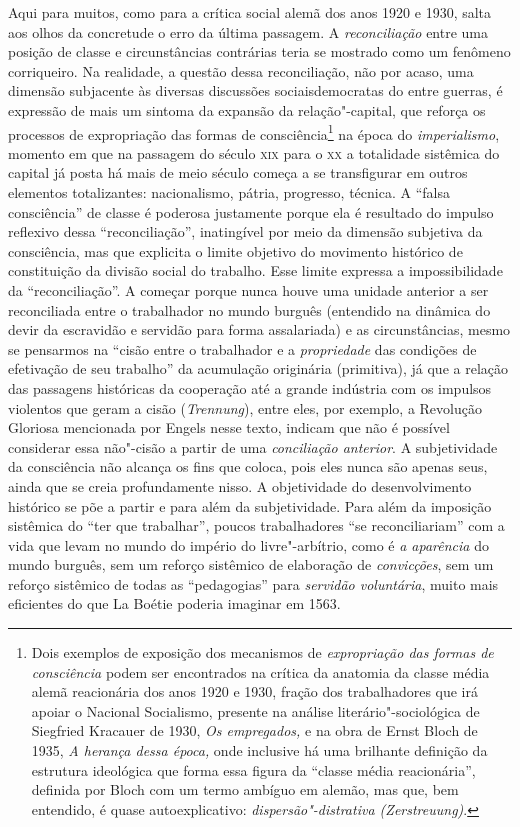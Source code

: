 Aqui para muitos, como para a crítica social alemã dos anos 1920 e 1930,
salta aos olhos da concretude o erro da última passagem. A
\emph{reconciliação} entre uma posição de classe e circunstâncias
contrárias teria se mostrado como um fenômeno corriqueiro. Na realidade,
a questão dessa reconciliação, não por acaso, uma dimensão subjacente às
diversas discussões sociaisdemocratas do entre guerras, é expressão de
mais um sintoma da expansão da relação"-capital, que reforça os processos
de expropriação das formas de consciência\footnote{Dois exemplos de
  exposição dos mecanismos de \emph{expropriação das formas de
  consciência} podem ser encontrados na crítica da anatomia da classe
  média alemã reacionária dos anos 1920 e 1930, fração dos trabalhadores
  que irá apoiar o Nacional Socialismo, presente na análise
  literário"-sociológica de Siegfried Kracauer de 1930, \emph{Os
  empregados,} e na obra de Ernst Bloch de 1935, \emph{A herança dessa
  época,} onde inclusive há uma brilhante definição da estrutura
  ideológica que forma essa figura da ``classe média reacionária'',
  definida por Bloch com um termo ambíguo em alemão, mas que, bem
  entendido, é quase autoexplicativo: \emph{dispersão"-distrativa
  (Zerstreuung)}.} na época do \emph{imperialismo}, momento em que na
passagem do século \textsc{xix} para o \textsc{xx} a totalidade sistêmica do capital já
posta há mais de meio século começa a se transfigurar em outros
elementos totalizantes: nacionalismo, pátria, progresso, técnica. A
``falsa consciência'' de classe é poderosa justamente porque ela é
resultado do impulso reflexivo dessa ``reconciliação'', inatingível por
meio da dimensão subjetiva da consciência, mas que explicita o limite
objetivo do movimento histórico de constituição da divisão social do
trabalho. Esse limite expressa a impossibilidade da ``reconciliação''. A
começar porque nunca houve uma unidade anterior a ser reconciliada entre
o trabalhador no mundo burguês (entendido na dinâmica do devir da
escravidão e servidão para forma assalariada) e as circunstâncias, mesmo
se pensarmos na ``cisão entre o trabalhador e a \emph{propriedade} das
condições de efetivação de seu trabalho'' da acumulação originária
(primitiva), já que a relação das passagens históricas da cooperação até
a grande indústria com os impulsos violentos que geram a cisão
(\emph{Trennung}), entre eles, por exemplo, a Revolução Gloriosa
mencionada por Engels nesse texto, indicam que não é possível considerar
essa não"-cisão a partir de uma \emph{conciliação anterior}. A
subjetividade da consciência não alcança os fins que coloca, pois eles
nunca são apenas seus, ainda que se creia profundamente nisso. A
objetividade do desenvolvimento histórico se põe a partir e para além da
subjetividade. Para além da imposição sistêmica do ``ter que
trabalhar'', poucos trabalhadores ``se reconciliariam'' com a vida que
levam no mundo do império do livre"-arbítrio, como é \emph{a aparência}
do mundo burguês, sem um reforço sistêmico de elaboração de
\emph{convicções}, sem um reforço sistêmico de todas as ``pedagogias''
para \emph{servidão voluntária}, muito mais eficientes do que La Boétie
poderia imaginar em 1563.

